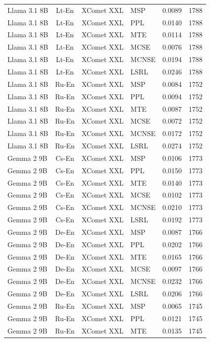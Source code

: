 \begin{table}
\begin{tabular}{lc}
Llama 3.1 8B & Lt-En & XComet XXL & MSP & 0.0089 & 1788 \\
Llama 3.1 8B & Lt-En & XComet XXL & PPL & 0.0140 & 1788 \\
Llama 3.1 8B & Lt-En & XComet XXL & MTE & 0.0114 & 1788 \\
Llama 3.1 8B & Lt-En & XComet XXL & MCSE & 0.0076 & 1788 \\
Llama 3.1 8B & Lt-En & XComet XXL & MCNSE & 0.0194 & 1788 \\
Llama 3.1 8B & Lt-En & XComet XXL & LSRL & 0.0246 & 1788 \\
Llama 3.1 8B & Ru-En & XComet XXL & MSP & 0.0084 & 1752 \\
Llama 3.1 8B & Ru-En & XComet XXL & PPL & 0.0094 & 1752 \\
Llama 3.1 8B & Ru-En & XComet XXL & MTE & 0.0087 & 1752 \\
Llama 3.1 8B & Ru-En & XComet XXL & MCSE & 0.0072 & 1752 \\
Llama 3.1 8B & Ru-En & XComet XXL & MCNSE & 0.0172 & 1752 \\
Llama 3.1 8B & Ru-En & XComet XXL & LSRL & 0.0274 & 1752 \\
Gemma 2 9B & Cs-En & XComet XXL & MSP & 0.0106 & 1773 \\
Gemma 2 9B & Cs-En & XComet XXL & PPL & 0.0150 & 1773 \\
Gemma 2 9B & Cs-En & XComet XXL & MTE & 0.0140 & 1773 \\
Gemma 2 9B & Cs-En & XComet XXL & MCSE & 0.0102 & 1773 \\
Gemma 2 9B & Cs-En & XComet XXL & MCNSE & 0.0210 & 1773 \\
Gemma 2 9B & Cs-En & XComet XXL & LSRL & 0.0192 & 1773 \\
Gemma 2 9B & De-En & XComet XXL & MSP & 0.0087 & 1766 \\
Gemma 2 9B & De-En & XComet XXL & PPL & 0.0202 & 1766 \\
Gemma 2 9B & De-En & XComet XXL & MTE & 0.0165 & 1766 \\
Gemma 2 9B & De-En & XComet XXL & MCSE & 0.0097 & 1766 \\
Gemma 2 9B & De-En & XComet XXL & MCNSE & 0.0232 & 1766 \\
Gemma 2 9B & De-En & XComet XXL & LSRL & 0.0206 & 1766 \\
Gemma 2 9B & Ru-En & XComet XXL & MSP & 0.0065 & 1745 \\
Gemma 2 9B & Ru-En & XComet XXL & PPL & 0.0121 & 1745 \\
Gemma 2 9B & Ru-En & XComet XXL & MTE & 0.0135 & 1745 \\

\end{tabular}
\end{table}
